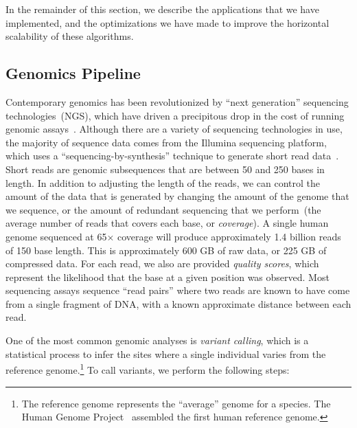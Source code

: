 \documentclass{acm_proc_article-sp}
\begin{document}
In the remainder of this section, we describe the applications that we have implemented, and the
optimizations we have made to improve the horizontal scalability of these algorithms.

\subsection{Genomics Pipeline}
\label{sec:genomics-pipeline}

Contemporary genomics has been revolutionized by ``next generation'' sequencing
technologies~(NGS), which have \linebreak driven a precipitous drop in the cost of running genomic
assays~\cite{nhgri}. Although there are a variety of sequencing technologies in use, the majority of
sequence data comes from the Illumina sequencing platform, which uses a ``sequencing-by-synthesis''
technique to generate short read data~\cite{metzker09}. Short reads are genomic subsequences that
are between 50 and 250 bases in length. In addition to
adjusting the length of the reads, we can control the amount of the data that is generated by
changing the amount of the genome that we sequence, or the amount of redundant sequencing that
we perform~(the average number of reads that covers each base, or \emph{coverage}). A single
human genome sequenced at 65$\times$ coverage will produce approximately 1.4 billion reads of 150 base length.
This is approximately 600 GB of raw data, or 225 GB of compressed data. For each read, we also
are provided \emph{quality scores}, which represent the likelihood that the base at a given position
was observed. Most sequencing assays sequence ``read pairs'' where two reads are known to have
come from a single fragment of DNA, with a known approximate distance between each read.

One of the most common genomic analyses is \emph{variant calling}, which is a statistical process to
infer the sites where a single individual varies from the reference genome.\footnote{The
reference genome represents the ``average'' genome for a species. The Human Genome
Project~\cite{lander01} assembled the first human reference genome.} To call variants, we perform the
following steps:
\end{document}
